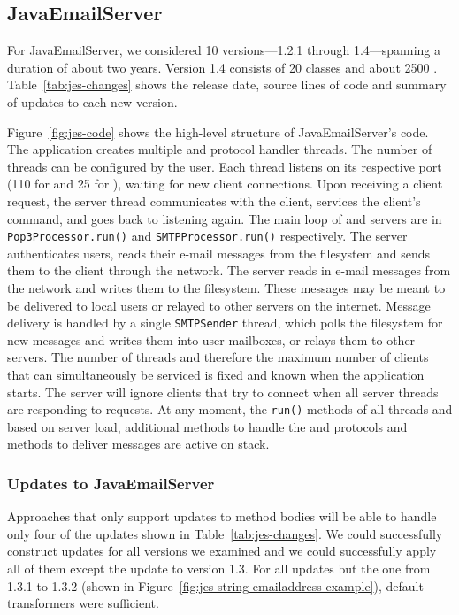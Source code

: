 

\subsection{JavaEmailServer}
\label{subsec:jes}

For JavaEmailServer, we considered 10 versions---1.2.1 through
1.4---spanning a duration of about two years.  Version 1.4 consists of 20
classes and about 2500 \SLOC.  Table~\ref{tab:jes-changes} shows the
release date, source lines of code and summary of updates to each new
version.

Figure~\ref{fig:jes-code} shows the
high-level structure of JavaEmailServer's code. The application creates
multiple \POP and \SMTP protocol handler threads. The number of threads can
be configured by the user. Each thread listens on its respective port (110
for \POP and 25 for \SMTP), waiting for new client connections. Upon
receiving a client request, the server thread communicates with the client,
services the client's command, and goes back to listening again. The
main loop of \POP and \SMTP servers are in {\tt Pop3Processor.run()} and
{\tt SMTPProcessor.run()} respectively. The \POP server authenticates
users, reads their e-mail messages from the filesystem and sends them to
the client through the network. The \SMTP server reads in e-mail messages
from the network and writes them to the filesystem. These messages may be meant
to be delivered to local users or relayed to other servers on the internet.
Message delivery is handled by a single {\tt SMTPSender} thread, which
polls the filesystem for new messages and writes them into user mailboxes,
or relays them to other servers. The number of threads and therefore the
maximum number of clients that can simultaneously be serviced is fixed and
known when the application starts. The server will ignore clients that try
to connect when all server threads are responding to requests. At any
moment, the {\tt run()} methods of all threads and based on server load,
additional methods to handle the \POP and \SMTP protocols and methods to
deliver messages are active on stack.



\subsubsection{Updates to JavaEmailServer}
Approaches that only support updates to method bodies will be able to
handle only four of the updates shown in Table~\ref{tab:jes-changes}.  We
could successfully construct updates for all versions we examined and we
could successfully apply all of them except the update to version 1.3. For
all updates but the one from 1.3.1 to 1.3.2 (shown in
Figure~\ref{fig:jes-string-emailaddress-example}), default transformers were
sufficient.


